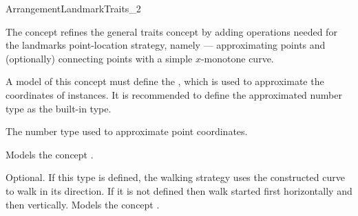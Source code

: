 
\ccRefPageBegin
\begin{ccRefConcept}{ArrangementLandmarkTraits_2}

\ccDefinition
The concept \ccRefName{} refines the general traits concept by adding
operations needed for the landmarks point-location strategy, namely ---
approximating points and (optionally) connecting points with a simple
$x$-monotone curve.

A model of this concept must define the , which
is used to approximate the coordinates of  instances. It is
recommended to define the approximated number type as the built-in
 type. 

\ccRefines
{}

\ccTypes
%
  {The number type used to approximate point coordinates.}

\ccThreeToTwo
{}%
  {Models the concept .}

%
  {Optional. If this type is defined, the walking strategy uses the
  constructed curve to walk in its direction. If it is not defined
  then walk started first horizontally and then vertically.
  Models the concept .}


 {}
\ccGlue
{}

\ccHasModels
\\
\\
\\
\\

\ccSeeAlso

\end{ccRefConcept}
\ccRefPageEnd

